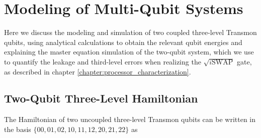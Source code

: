 \chapter{Modeling of Multi-Qubit Systems}

Here we discuss the modeling and simulation of two coupled three-level Transmon qubits, using analytical calculations to obtain the relevant qubit energies and explaining the master equation simulation of the two-qubit system, which we use to quantify the leakage and third-level errors when realizing the $\sqrt{i\mathrm{SWAP}}$ gate, as described in chapter \ref{chapter:processor_characterization}.

\section{Two-Qubit Three-Level Hamiltonian} \label{section:three_level_simulation}

The Hamiltonian of two uncoupled three-level Transmon qubits can be written in the basis $\{00,01,02,10,11,12,20,21,22\}$ as

